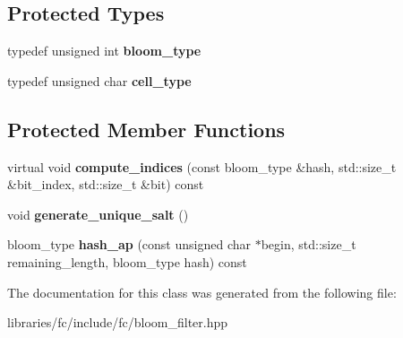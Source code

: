 \subsection*{Protected Types}
\begin{DoxyCompactItemize}
\item 
\mbox{\label{classfc_1_1bloom__filter_af12d535213b1ff5966b9a61b4237a5d4}} 
typedef unsigned int {\bfseries bloom\+\_\+type}
\item 
\mbox{\label{classfc_1_1bloom__filter_a543c4ce28a4fedb25557bd977a657ac7}} 
typedef unsigned char {\bfseries cell\+\_\+type}
\end{DoxyCompactItemize}
\subsection*{Protected Member Functions}
\begin{DoxyCompactItemize}
\item 
\mbox{\label{classfc_1_1bloom__filter_a782a4ca932e2f8a03b11dd41652a5e69}} 
virtual void {\bfseries compute\+\_\+indices} (const bloom\+\_\+type \&hash, std\+::size\+\_\+t \&bit\+\_\+index, std\+::size\+\_\+t \&bit) const
\item 
\mbox{\label{classfc_1_1bloom__filter_a8f2e62c9d3c975c761d37669e92c38db}} 
void {\bfseries generate\+\_\+unique\+\_\+salt} ()
\item 
\mbox{\label{classfc_1_1bloom__filter_a953b432cacd40b9d2493ff910b0672fa}} 
bloom\+\_\+type {\bfseries hash\+\_\+ap} (const unsigned char $\ast$begin, std\+::size\+\_\+t remaining\+\_\+length, bloom\+\_\+type hash) const
\end{DoxyCompactItemize}


The documentation for this class was generated from the following file\+:\begin{DoxyCompactItemize}
\item 
libraries/fc/include/fc/bloom\+\_\+filter.\+hpp\end{DoxyCompactItemize}
